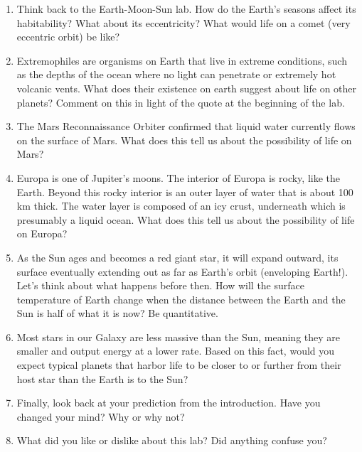 \documentclass[12pt]{article}
\begin{document}
\begin{enumerate}

\item Think back to the Earth-Moon-Sun lab. How do the Earth's seasons affect its habitability? What about its eccentricity? What would life on a comet (very eccentric orbit) be like? 

\item Extremophiles are organisms on Earth that live in extreme conditions, such as the depths of the ocean where no light can penetrate or extremely hot volcanic vents.  
What does their existence on earth suggest about life on other planets?  
Comment on this in light of the quote at the beginning of the lab.

\item The Mars Reconnaissance Orbiter confirmed that liquid water currently flows on the surface of Mars. 
What does this tell us about the possibility of life on Mars?   

\item Europa is one of Jupiter's moons.  
The interior of Europa is rocky, like the Earth.  
Beyond this rocky interior is an outer layer of water that is about 100 km thick.  
The water layer is composed of an icy crust, underneath which is presumably a liquid ocean.  
What does this tell us about the possibility of life on Europa?  

\item As the Sun ages and becomes a red giant star, it will expand outward, its surface eventually extending out as far as Earth's orbit (enveloping Earth!).  
Let's think about what happens before then.  
How will the surface temperature of Earth change when the distance between the Earth and the Sun is half of what it is now? Be quantitative.

\item Most stars in our Galaxy are less massive than the Sun, meaning they are smaller and output energy at a lower rate. 
Based on this fact, would you expect typical planets that harbor life to be closer to or further from their host star than the Earth is to the Sun?

\item Finally, look back at your prediction from the introduction. Have you changed your mind? Why or why not?

\item What did you like or dislike about this lab? 
Did anything confuse you? 
\end{enumerate}
\end{document}
